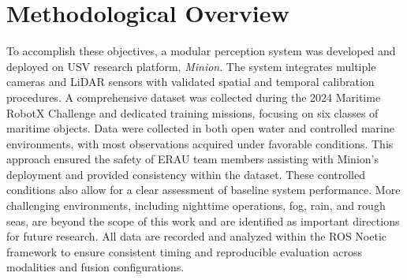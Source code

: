 
\section{Methodological Overview}
To accomplish these objectives, a modular perception system was developed and deployed on  \ac{USV} research platform, \textit{Minion}.
The system integrates multiple cameras and \ac{LiDAR} sensors with validated spatial and temporal calibration procedures.
A comprehensive dataset was collected during the 2024 Maritime RobotX Challenge and dedicated training missions, focusing on six classes of maritime objects.
Data were collected in both open water and controlled marine environments, with most observations acquired under favorable conditions. 
This approach ensured the safety of \ac{ERAU} team members assisting with Minion’s deployment and provided consistency within the dataset. 
These controlled conditions also allow for a clear assessment of baseline system performance. 
More challenging environments, including nighttime operations, fog, rain, and rough seas, are beyond the scope of this work and are identified as important directions for future research.
All data are recorded and analyzed within the \ac{ROS} Noetic framework to ensure consistent timing and reproducible evaluation across modalities and fusion configurations.

